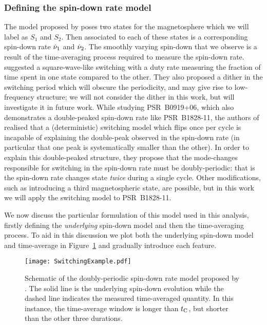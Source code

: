 \documentclass[../full_thesis/full_thesis.tex]{subfiles}
\begin{document}
\subsubsection{Defining the spin-down rate model}
\label{sec: spin-down rate}

The model proposed by \citet{Lyne2010} poses two states for the magnetosphere
which we will label as $S_{1}$ and $S_{2}$. Then associated to each of these
states is a corresponding spin-down rate $\dot{\nu}_{1}$ and $\dot{\nu}_{2}$. The
smoothly varying spin-down that we observe is a result of the time-averaging
process required to measure the spin-down rate. \citet{Lyne2010} suggested a
square-wave-like switching with a duty rate measuring the fraction of time
spent in one state compared to the other. They also proposed a dither in the
switching period which will obscure the periodicity, and may give rise to
low-frequency structure; we will not consider the dither in this work, but will
investigate it in future work. While studying PSR~B0919+06, which also
demonstrates a double-peaked spin-down rate like PSR~B1828-11, the authors of
\citet{Perera2015} realised that a (deterministic) switching model which flips
once per cycle is incapable of explaining the double-peak observed in the
spin-down rate (in particular that one peak is systematically smaller than the
other). In order to explain this double-peaked structure, they propose that the
mode-changes responsible for switching in the spin-down rate must be
doubly-periodic: that is the spin-down rate changes state \emph{twice} during a
single cycle. Other modifications, such as introducing a third magnetospheric
state, are possible, but in this work we will apply the \citet{Perera2015}
switching model to PSR~B1828-11.

We now discuss the particular formulation of this model used in this
analysis, firstly defining the \emph{underlying} spin-down model and then the
time-averaging process. To aid in this discussion we plot both the underlying
spin-down model and time-average in Figure~\ref{fig: perera illustration} and
gradually introduce each feature.
\begin{figure}
\centering \texttt{[image: SwitchingExample.pdf]}
\caption{Schematic of the doubly-periodic spin-down rate model proposed by
\citet{Perera2015}. The solid line is the underlying spin-down evolution while
the dashed line indicates the measured time-averaged quantity. In this
instance, the time-average window is longer than $t_{\mathrm{C}}$, but shorter than the
other three durations.}
\label{fig: perera illustration}
\end{figure}
\end{document}
